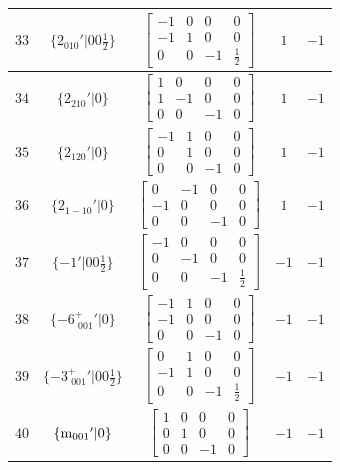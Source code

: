 \documentclass[fleqn,8pt]{jsarticle}
\begin{document}
\begin{longtable}{ccccc}
$ 33 $ & $ \{2{}_{010}{}'|0 0 \frac{1}{2}\} $ & $ \begin{bmatrix} -1 & 0 & 0 & 0 \\ -1 & 1 & 0 & 0 \\ 0 & 0 & -1 & \frac{1}{2} \end{bmatrix} $ & $ 1 $ & $ -1 $ \\ \hline
$ 34 $ & $ \{2{}_{210}{}'|0\} $ & $ \begin{bmatrix} 1 & 0 & 0 & 0 \\ 1 & -1 & 0 & 0 \\ 0 & 0 & -1 & 0 \end{bmatrix} $ & $ 1 $ & $ -1 $ \\ \hline
$ 35 $ & $ \{2{}_{120}{}'|0\} $ & $ \begin{bmatrix} -1 & 1 & 0 & 0 \\ 0 & 1 & 0 & 0 \\ 0 & 0 & -1 & 0 \end{bmatrix} $ & $ 1 $ & $ -1 $ \\ \hline
$ 36 $ & $ \{2{}_{1-10}{}'|0\} $ & $ \begin{bmatrix} 0 & -1 & 0 & 0 \\ -1 & 0 & 0 & 0 \\ 0 & 0 & -1 & 0 \end{bmatrix} $ & $ 1 $ & $ -1 $ \\ \hline
$ 37 $ & $ \{-1{}'|0 0 \frac{1}{2}\} $ & $ \begin{bmatrix} -1 & 0 & 0 & 0 \\ 0 & -1 & 0 & 0 \\ 0 & 0 & -1 & \frac{1}{2} \end{bmatrix} $ & $ -1 $ & $ -1 $ \\ \hline
$ 38 $ & $ \{-6^{+}_{\,\,001}{}'|0\} $ & $ \begin{bmatrix} -1 & 1 & 0 & 0 \\ -1 & 0 & 0 & 0 \\ 0 & 0 & -1 & 0 \end{bmatrix} $ & $ -1 $ & $ -1 $ \\ \hline
$ 39 $ & $ \{-3^{+}_{\,\,001}{}'|0 0 \frac{1}{2}\} $ & $ \begin{bmatrix} 0 & 1 & 0 & 0 \\ -1 & 1 & 0 & 0 \\ 0 & 0 & -1 & \frac{1}{2} \end{bmatrix} $ & $ -1 $ & $ -1 $ \\ \hline
$ 40 $ & $ \{{\rm m}_{001}{}'|0\} $ & $ \begin{bmatrix} 1 & 0 & 0 & 0 \\ 0 & 1 & 0 & 0 \\ 0 & 0 & -1 & 0 \end{bmatrix} $ & $ -1 $ & $ -1 $ \\ \hline

\end{longtable}
\end{document}
